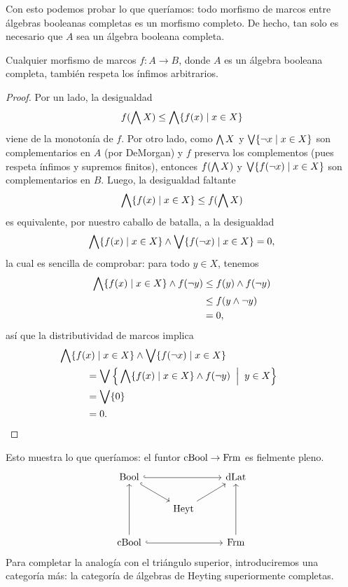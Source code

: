 Con esto podemos probar lo que queríamos: todo morfismo de marcos
entre álgebras booleanas completas es un morfismo completo.
De hecho, tan solo es necesario que $A$ sea un álgebra booleana
completa.
\begin{lemma}
    Cualquier morfismo de marcos $f:A\to B$,
    donde $A$ es un álgebra booleana completa,
    también respeta los ínfimos arbitrarios.
\end{lemma}
\begin{proof}
    Por un lado, la desigualdad
    \[
        f(\bigwedge X)\leq\bigwedge\{f(x)\mid x\in X\}
    \]
    viene de la monotonía de $f$.
    Por otro lado, como $\bigwedge X$ y $\bigvee\{\neg x\mid x\in X\}$
    son complementarios en $A$ (por DeMorgan)
    y $f$ preserva los complementos
    (pues respeta ínfimos y supremos finitos), entonces $f(\bigwedge X)$
    y $\bigvee\{f(\neg x)\mid x\in X\}$ son complementarios en $B$.
    Luego, la desigualdad faltante
    \[
        \bigwedge\{f(x)\mid x\in X\} \leq f(\bigwedge X)
    \]
    es equivalente, por nuestro caballo de batalla, a la desigualdad
    \[
        \bigwedge\{f(x)\mid x\in X\} \wedge \bigvee\{f(\neg x)\mid x\in X\} = 0,
    \]
    la cual es sencilla de comprobar: para todo $y\in X$, tenemos
    \begin{align*}
        \bigwedge\{f(x)\mid x\in X\} \wedge f(\neg y)
        &\leq f(y)\wedge f(\neg y) \\
        &\leq f(y\wedge \neg y) \\
        &= 0,
    \end{align*}
    así que la distributividad de marcos implica
    \begin{align*}
        &
        \hspace{-10mm}
        \Inf\{f(x)\mid x\in X\} \inf \Sup\{f(\neg x)\mid x\in X\} \\
        &= \Sup\Big\{\Inf\{f(x)\mid x\in X\}\inf f(\neg y)
            \;\;\Big|\;\; y\in X\Big\} \\
        &= \Sup\{0\} \\
        &= 0.
    \end{align*}
\end{proof}

Esto muestra lo que queríamos: el funtor $\mathrm{cBool}\to\mathrm{Frm}$ es fielmente
pleno.
\begin{equation}\label{diag:cuadrado-cba-frm}
\begin{tikzcd}
  \Bool \ar[dr,hook] \ar[rr,hook] &               & \DLat \\
                                  & \Heyt \ar[ur]         \\
  \CBA \ar[uu] \ar[rr,hook] &           & \Frm \ar[uu]
\end{tikzcd}
\end{equation}
Para completar la analogía con el triángulo superior, introduciremos
una categoría más: la categoría de álgebras de Heyting superiormente
completas.

